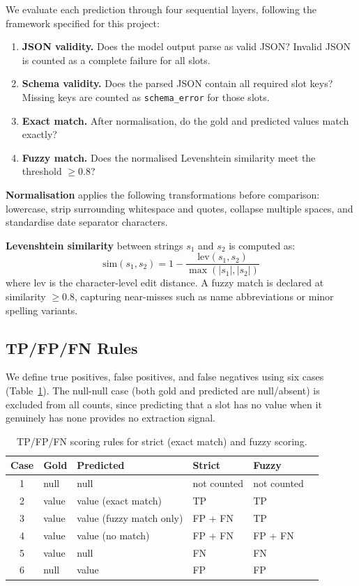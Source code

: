 \documentclass[11pt,a4paper]{article}
\begin{document}
We evaluate each prediction through four sequential layers, following the framework specified for this project:

\begin{enumerate}
    \item \textbf{JSON validity.} Does the model output parse as valid JSON? Invalid JSON is counted as a complete failure for all slots.
    \item \textbf{Schema validity.} Does the parsed JSON contain all required slot keys? Missing keys are counted as \texttt{schema\_error} for those slots.
    \item \textbf{Exact match.} After normalisation, do the gold and predicted values match exactly?
    \item \textbf{Fuzzy match.} Does the normalised Levenshtein similarity meet the threshold $\geq 0.8$?
\end{enumerate}

\textbf{Normalisation} applies the following transformations before comparison: lowercase, strip surrounding whitespace and quotes, collapse multiple spaces, and standardise date separator characters.

\textbf{Levenshtein similarity} between strings $s_1$ and $s_2$ is computed as:
\[
\text{sim}(s_1, s_2) = 1 - \frac{\text{lev}(s_1, s_2)}{\max(|s_1|, |s_2|)}
\]
where $\text{lev}$ is the character-level edit distance. A fuzzy match is declared at similarity $\geq 0.8$, capturing near-misses such as name abbreviations or minor spelling variants.

\subsection{TP/FP/FN Rules}

We define true positives, false positives, and false negatives using six cases (Table~\ref{tab:scoring_rules}). The null-null case (both gold and predicted are null/absent) is excluded from all counts, since predicting that a slot has no value when it genuinely has none provides no extraction signal.

\begin{table}[h]
\centering
\caption{TP/FP/FN scoring rules for strict (exact match) and fuzzy scoring.}
\label{tab:scoring_rules}
\begin{tabular}{clllll}
\toprule
\textbf{Case} & \textbf{Gold} & \textbf{Predicted} & \textbf{Strict} & \textbf{Fuzzy} \\
\midrule
1 & null  & null  & not counted & not counted \\
2 & value & value (exact match)  & TP & TP \\
3 & value & value (fuzzy match only) & FP + FN & TP \\
4 & value & value (no match) & FP + FN & FP + FN \\
5 & value & null  & FN & FN \\
6 & null  & value & FP & FP \\
\bottomrule
\end{tabular}
\end{table}
\end{document}
